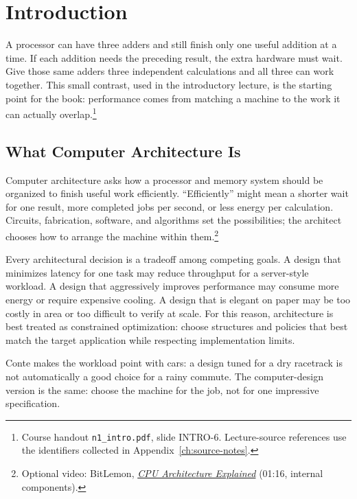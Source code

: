 \chapter{Introduction}\label{ch:auto-002}

A processor can have three adders and still finish only one useful addition at a time.
If each addition needs the preceding result, the extra hardware must wait.
Give those same adders three independent calculations and all three can work together.
This small contrast, used in the introductory lecture, is the starting point for the book: performance comes from matching a machine to the work it can actually overlap.\footnote{Course handout \texttt{n1\_intro.pdf}, slide INTRO-6. Lecture-source references use the identifiers collected in Appendix~\ref{ch:source-notes}.}


\section{What Computer Architecture Is}\label{sec:auto-003}
Computer architecture asks how a processor and memory system should be organized to finish useful work efficiently.
``Efficiently'' might mean a shorter wait for one result, more completed jobs per second, or less energy per calculation.
Circuits, fabrication, software, and algorithms set the possibilities; the architect chooses how to arrange the machine within them.\footnote{Optional video: BitLemon, \href{https://youtu.be/GtVDTp826DE?t=76}{\emph{CPU Architecture Explained}} (01:16, internal components).}

Every architectural decision is a tradeoff among competing goals.
A design that minimizes latency for one task may reduce throughput for a server-style workload.
A design that aggressively improves performance may consume more energy or require expensive cooling.
A design that is elegant on paper may be too costly in area or too difficult to verify at scale.
For this reason, architecture is best treated as constrained optimization: choose structures and policies that best match the target application while respecting implementation limits.

Conte makes the workload point with cars: a design tuned for a dry racetrack is not automatically a good choice for a rainy commute.
The computer-design version is the same: choose the machine for the job, not for one impressive specification.

